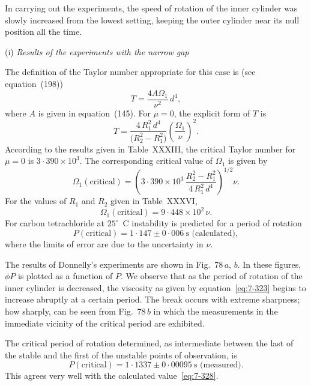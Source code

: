 In carrying out the experiments, the speed of rotation of the inner
cylinder was slowly increased from the lowest setting, keeping the
outer cylinder near its null position all the time.

\medskip
\noindent (i) \textit{Results of the experiments with the narrow gap}

The definition of the Taylor number appropriate for this case is (see
equation~(198))
\begin{equation}\label{eq:7-324}
T = \frac{4A\Omega_1}{\nu^2}\,d^4,
\end{equation}
where $A$ is given in equation~(145).  For $\mu = 0$, the explicit form of $T$ is
\begin{equation}\label{eq:7-325}
T = \frac{4\,R_1^2\,d^4}{\bigl(R_2^2 - R_1^2\bigr)}\left(\frac{\Omega_1}{\nu}\right)^{\!2}.
\end{equation}
According to the results given in Table~XXXIII, the critical Taylor
number for $\mu = 0$ is $3{\cdot}390 \times 10^3$.  The corresponding critical value of $\Omega_1$
is given by
\begin{equation}\label{eq:7-326}
\Omega_1(\text{critical}) = \left(3{\cdot}390 \times 10^3\,\frac{R_2^2 - R_1^2}{4\,R_1^2\,d^4}\right)^{1/2}\!\nu.
\end{equation}
For the values of $R_1$ and $R_2$ given in Table~XXXVI,
\begin{equation}\label{eq:7-327}
\Omega_1(\text{critical}) = 9{\cdot}448 \times 10^2\,\nu.
\end{equation}
For carbon tetrachloride at $25^{\circ}$~C instability is predicted for a period of
rotation
\begin{equation}\label{eq:7-328}
P(\text{critical}) = 1{\cdot}147 \pm 0{\cdot}006~\text{s (calculated)},
\end{equation}
where the limits of error are due to the uncertainty in $\nu$.

The results of Donnelly's experiments are shown in Fig.~78\,$a$, $b$.  In
these figures, $\phi P$ is plotted as a function of $P$.  We observe that as the
period of rotation of the inner cylinder is decreased, the viscosity as
given by equation~\eqref{eq:7-323} begins to increase abruptly at a certain period.
The break occurs with extreme sharpness; how sharply, can be seen from
Fig.~78\,$b$ in which the measurements in the immediate vicinity of the
critical period are exhibited.

The critical period of rotation determined, as intermediate between
the last of the stable and the first of the unstable points of observation, is
\begin{equation}\label{eq:7-329}
P(\text{critical}) = 1{\cdot}1337 \pm 0{\cdot}00095~\text{s (measured)}.
\end{equation}
This agrees very well with the calculated value~\eqref{eq:7-328}.

